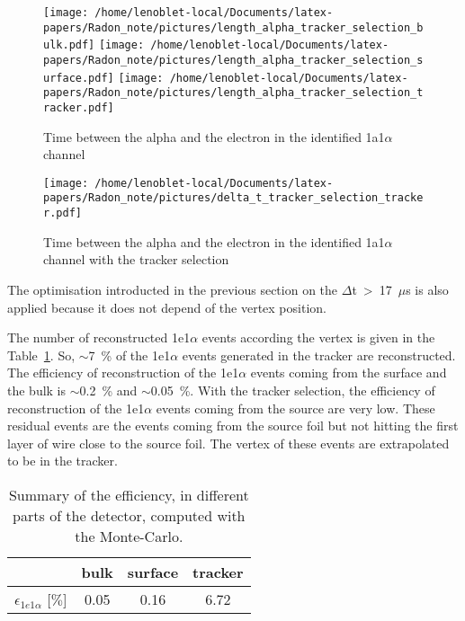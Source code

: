 \documentclass[main.tex]{subfiles}
\begin{document}
\begin{figure}[h!]
\begin{center}
\texttt{[image: /home/lenoblet-local/Documents/latex-papers/Radon\_note/pictures/length\_alpha\_tracker\_selection\_bulk.pdf]}
\texttt{[image: /home/lenoblet-local/Documents/latex-papers/Radon\_note/pictures/length\_alpha\_tracker\_selection\_surface.pdf]}
\texttt{[image: /home/lenoblet-local/Documents/latex-papers/Radon\_note/pictures/length\_alpha\_tracker\_selection\_tracker.pdf]}
\caption{Time between the alpha and the electron in the identified 1a1$\alpha$ channel}
\label{alpha_length_tracker_selection}
\end{center}
\end{figure}


\begin{figure}[h!]
\begin{center}
\texttt{[image: /home/lenoblet-local/Documents/latex-papers/Radon\_note/pictures/delta\_t\_tracker\_selection\_tracker.pdf]}
\caption{Time between the alpha and the electron in the identified 1a1$\alpha$ channel with the tracker selection}
\label{delta_t_tracker_selection}
\end{center}
\end{figure}


\bigskip


\noindent The optimisation introducted in the previous section on the $\Delta$t~>~17~$\mu$s is also applied because it does not depend of the vertex position. 


\bigskip


\noindent The number of reconstructed 1e1$\alpha$ events according the vertex is given in the Table~\ref{efficiency_different_parts_tracker}. So, $\sim$7~\% of the 1e1$\alpha$ events generated in the tracker are reconstructed. The efficiency of reconstruction of the 1e1$\alpha$ events coming from the surface and the bulk is $\sim$0.2~\% and $\sim$0.05~\%. With the tracker selection, the efficiency of reconstruction of the 1e1$\alpha$ events coming from the source are very low. These residual events are the events coming from the source foil but not hitting the first layer of wire close to the source foil. The vertex of these events are extrapolated to be in the tracker.


\begin{table}[h!]
\begin{center}
\begin{tabular}{c|c|c|c}
           & bulk   & surface & tracker \\
\hline
$\epsilon_{1e1\alpha}$ [$\%$] & 0.05 & 0.16  & 6.72 \\
\hline
\end{tabular}
\end{center}
\caption{Summary of the efficiency, in different parts of the detector, computed with the Monte-Carlo.}
\label{efficiency_different_parts_tracker}
\end{table}
\end{document}
